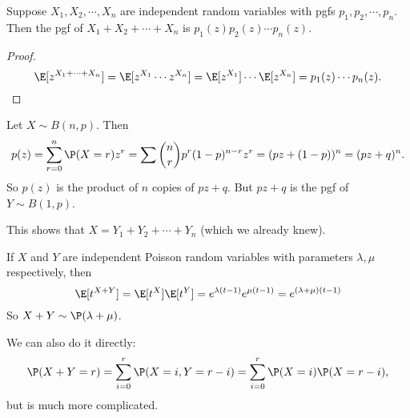 \documentclass[a4paper]{article}
\begin{document}
\begin{thm}
  Suppose $X_1, X_2, \cdots, X_n$ are independent random variables with pgfs $p_1, p_2, \cdots, p_n$. Then the pgf of $X_1 + X_2 + \cdots + X_n$ is $p_1(z)p_2(z)\cdots p_n(z)$.
\end{thm}

\begin{proof}
  \[
    \E[z^{X_1 + \cdots + X_n}] = \E[z^{X_1}\cdots z^{X_n}] = \E[z^{X_1}]\cdots\E[z^{X_n}] = p_1(z)\cdots p_n(z).
  \]
\end{proof}

\begin{eg}
  Let $X\sim B(n, p)$. Then
  \[
    p(z) = \sum_{r = 0}^{n} \P(X = r)z^r = \sum \binom{n}{r} p^r(1 - p)^{n - r}z^r = (pz + (1 - p))^n = (pz + q)^n.
  \]
  So $p(z)$ is the product of $n$ copies of $pz + q$. But $pz + q$ is the pgf of $Y\sim B(1, p)$.

  This shows that $X = Y_1 + Y_2 + \cdots + Y_n$ (which we already knew).
\end{eg}

\begin{eg}
  If $X$ and $Y$ are independent Poisson random variables with parameters $\lambda, \mu$ respectively, then
  \[
    \E[t^{X + Y}] = \E[t^X]\E[t^Y] = e^{\lambda(t - 1)}e^{\mu(t - 1)} = e^{(\lambda + \mu)(t - 1)}
  \]
  So $X + Y\sim \P(\lambda + \mu)$.

  We can also do it directly:
  \[
    \P(X + Y = r) = \sum_{i = 0}^r \P(X = i, Y = r - i) = \sum_{i = 0}^r \P(X = i)\P(X = r - i),
  \]
  but is much more complicated.
\end{eg}
\end{document}
